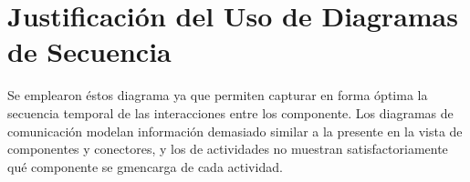 \documentclass[10pt,titlepage]{article}
\begin{document}
\section*{Justificación del Uso de Diagramas de Secuencia}
Se emplearon éstos diagrama ya que permiten capturar en forma óptima la secuencia temporal de las interacciones entre los componente. Los diagramas de comunicación modelan información demasiado similar a la presente en la vista de componentes y conectores, y los de actividades no muestran satisfactoriamente qué componente se gmencarga de cada actividad.
\end{document}
